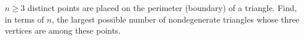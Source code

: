 $n\ge3$ distinct points are placed on the perimeter (boundary) of a triangle. Find, in terms of $n$, the largest possible number of nondegenerate triangles whose three vertices are among these points.
